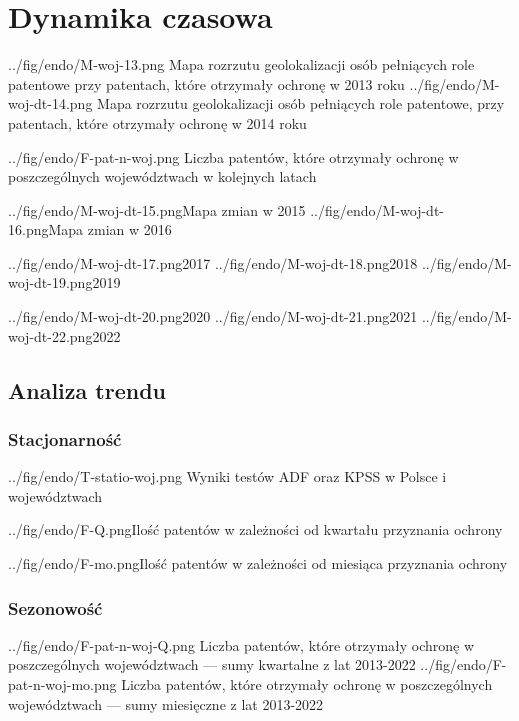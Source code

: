 \section{Dynamika czasowa}


  \newpage\figsides
{../fig/endo/M-woj-13.png}
{ Mapa rozrzutu geolokalizacji osób pełniących role patentowe 
  przy patentach, które otrzymały ochronę w 2013 roku}
{../fig/endo/M-woj-dt-14.png}
{ Mapa rozrzutu geolokalizacji osób pełniących role patentowe, 
  przy patentach, które otrzymały ochronę w 2014 roku}

  \figside
{../fig/endo/F-pat-n-woj.png}
{ Liczba patentów, które otrzymały ochronę w poszczególnych województwach 
  w kolejnych latach }

  \newpage\figsides
{../fig/endo/M-woj-dt-15.png}{Mapa zmian w 2015}
{../fig/endo/M-woj-dt-16.png}{Mapa zmian w 2016}

  \figsidesTri
{../fig/endo/M-woj-dt-17.png}{2017}
{../fig/endo/M-woj-dt-18.png}{2018}
{../fig/endo/M-woj-dt-19.png}{2019}

  \figsidesTri
{../fig/endo/M-woj-dt-20.png}{2020}
{../fig/endo/M-woj-dt-21.png}{2021}
{../fig/endo/M-woj-dt-22.png}{2022}




  \newpage\subsection
{Analiza trendu}



  \subsubsection
{Stacjonarność}

  \tblside
{../fig/endo/T-statio-woj.png}
{ Wyniki testów ADF oraz KPSS w Polsce i województwach}




  \fig
{../fig/endo/F-Q.png}{Ilość patentów w zależności od kwartału przyznania ochrony}

  \fig
{../fig/endo/F-mo.png}{Ilość patentów w zależności od miesiąca przyznania ochrony}



  \newpage\subsubsection
{Sezonowość}

  \figsides
{../fig/endo/F-pat-n-woj-Q.png}
{ Liczba patentów, które otrzymały ochronę w poszczególnych województwach 
  --- sumy kwartalne z lat 2013-2022 }
{../fig/endo/F-pat-n-woj-mo.png}
{ Liczba patentów, które otrzymały ochronę w poszczególnych województwach 
  --- sumy miesięczne z lat 2013-2022 }









